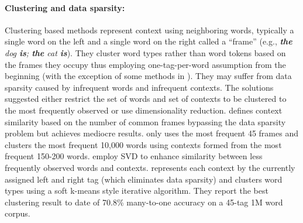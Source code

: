 \documentclass[11pt]{article}
\begin{document}
\paragraph{Clustering and data sparsity:}
Clustering based methods represent context using neighboring words,
typically a single word on the left and a single word on the right
called a ``frame'' (e.g., {\em {\bf the} dog {\bf is}; {\bf the} cat
  {\bf is}}).  They cluster word types rather than word tokens based
on the frames they occupy thus employing one-tag-per-word assumption
from the beginning (with the exception of some methods in
\cite{Schutze:1995:DPT:976973.976994}).  They may suffer from data
sparsity caused by infrequent words and infrequent contexts.  The
solutions suggested either restrict the set of words and set of
contexts to be clustered to the most frequently observed or use
dimensionality reduction.  \cite{redington1998distributional} defines
context similarity based on the number of common frames bypassing the
data sparsity problem but achieves mediocre results.
\cite{mintz2003frequent} only uses the most frequent 45 frames and
\cite{biemann2006unsupervised} clusters the most frequent 10,000 words
using contexts formed from the most frequent 150-200 words.
\cite{Schutze:1995:DPT:976973.976994,lamar-EtAl:2010:Short} employ SVD
to enhance similarity between less frequently observed words and
contexts.  \cite{Lamar:2010:LCU:1870658.1870736} represents each
context by the currently assigned left and right tag (which eliminates
data sparsity) and clusters word types using a soft k-means style
iterative algorithm.  They report the best clustering result to date
of 70.8\% many-to-one accuracy on a 45-tag 1M word corpus.

\end{document}
